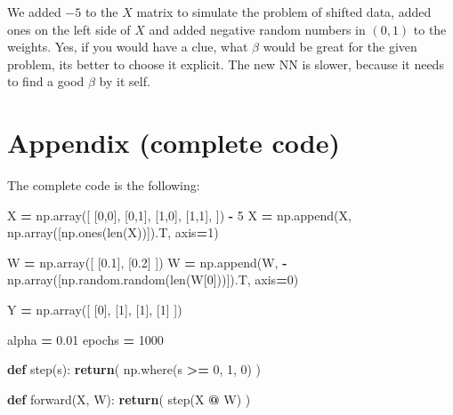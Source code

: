 \documentclass[
]{book}
\newenvironment{Shaded}{\begin{snugshade}}{\end{snugshade}}
\newcommand{\BuiltInTok}[1]{#1}
\newcommand{\ControlFlowTok}[1]{\textcolor[rgb]{0.13,0.29,0.53}{\textbf{#1}}}
\newcommand{\DecValTok}[1]{\textcolor[rgb]{0.00,0.00,0.81}{#1}}
\newcommand{\FloatTok}[1]{\textcolor[rgb]{0.00,0.00,0.81}{#1}}
\newcommand{\KeywordTok}[1]{\textcolor[rgb]{0.13,0.29,0.53}{\textbf{#1}}}
\newcommand{\NormalTok}[1]{#1}
\newcommand{\OperatorTok}[1]{\textcolor[rgb]{0.81,0.36,0.00}{\textbf{#1}}}
\begin{document}
We added \(-5\) to the \(X\) matrix to simulate the problem of shifted data, added ones on the left side of \(X\) and added negative random numbers in \((0,1)\) to the weights. Yes, if you would have a clue, what \(\beta\) would be great for the given problem, its better to choose it explicit. The new NN is slower, because it needs to find a good \(\beta\) by it self.

\hypertarget{appendix-complete-code-1}{%
\section{Appendix (complete code)}\label{appendix-complete-code-1}}

The complete code is the following:

\begin{Shaded}
\begin{Highlighting}[]
\NormalTok{X }\OperatorTok{=}\NormalTok{ np.array([}
\NormalTok{  [}\DecValTok{0}\NormalTok{,}\DecValTok{0}\NormalTok{],}
\NormalTok{  [}\DecValTok{0}\NormalTok{,}\DecValTok{1}\NormalTok{],}
\NormalTok{  [}\DecValTok{1}\NormalTok{,}\DecValTok{0}\NormalTok{],}
\NormalTok{  [}\DecValTok{1}\NormalTok{,}\DecValTok{1}\NormalTok{],}
\NormalTok{]) }\OperatorTok{{-}} \DecValTok{5}
\NormalTok{X }\OperatorTok{=}\NormalTok{ np.append(X, np.array([np.ones(}\BuiltInTok{len}\NormalTok{(X))]).T, axis}\OperatorTok{=}\DecValTok{1}\NormalTok{)}

\NormalTok{W }\OperatorTok{=}\NormalTok{ np.array([}
\NormalTok{  [}\FloatTok{0.1}\NormalTok{], }
\NormalTok{  [}\FloatTok{0.2}\NormalTok{]}
\NormalTok{])}
\NormalTok{W }\OperatorTok{=}\NormalTok{ np.append(W, }\OperatorTok{{-}}\NormalTok{np.array([np.random.random(}\BuiltInTok{len}\NormalTok{(W[}\DecValTok{0}\NormalTok{]))]).T, axis}\OperatorTok{=}\DecValTok{0}\NormalTok{)}

\NormalTok{Y }\OperatorTok{=}\NormalTok{ np.array([}
\NormalTok{  [}\DecValTok{0}\NormalTok{],}
\NormalTok{  [}\DecValTok{1}\NormalTok{],}
\NormalTok{  [}\DecValTok{1}\NormalTok{],}
\NormalTok{  [}\DecValTok{1}\NormalTok{]}
\NormalTok{])}

\NormalTok{alpha }\OperatorTok{=} \FloatTok{0.01}
\NormalTok{epochs }\OperatorTok{=} \DecValTok{1000}

\KeywordTok{def}\NormalTok{ step(s):}
  \ControlFlowTok{return}\NormalTok{( np.where(s }\OperatorTok{\textgreater{}=} \DecValTok{0}\NormalTok{, }\DecValTok{1}\NormalTok{, }\DecValTok{0}\NormalTok{) )}


\KeywordTok{def}\NormalTok{ forward(X, W):}
  \ControlFlowTok{return}\NormalTok{( step(X }\OperatorTok{@}\NormalTok{ W) )}


\end{Highlighting}
\end{Shaded}
\end{document}
